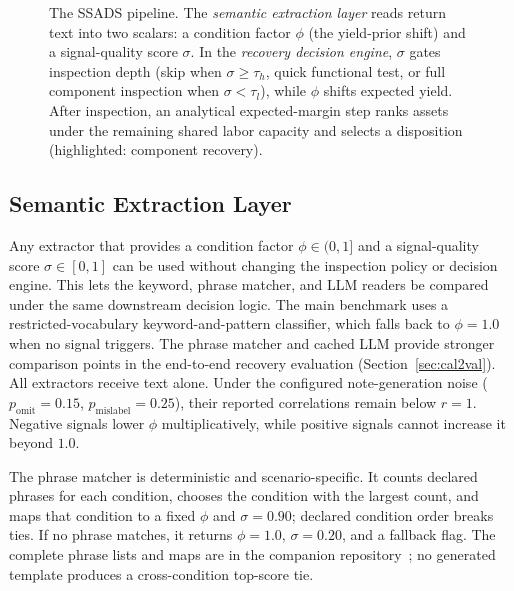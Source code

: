 \documentclass[a4paper,conference]{IEEEtran}
\begin{document}
\begin{figure}[t]
  \caption{The SSADS pipeline. The \emph{semantic extraction layer} reads return
    text into two scalars: a condition factor $\phi$ (the yield-prior shift) and a
    signal-quality score $\sigma$. In the \emph{recovery decision engine}, $\sigma$ gates
    inspection depth (skip when $\sigma{\ge}\tau_h$, quick functional test, or full
    component inspection when $\sigma{<}\tau_l$), while $\phi$ shifts expected yield.
    After inspection, an analytical expected-margin step ranks assets under the
    remaining shared labor capacity and selects a disposition (highlighted:
    component recovery).}
  \label{fig:pipeline}
\end{figure}

\subsection{Semantic Extraction Layer}
Any extractor that provides a condition factor $\phi\in(0,1]$ and a signal-quality score
$\sigma\in[0,1]$ can be used without changing the inspection policy or decision
engine. This lets the keyword, phrase matcher, and LLM readers be compared under
the same downstream decision logic. The main benchmark uses a restricted-vocabulary
keyword-and-pattern classifier, which falls back to $\phi{=}1.0$ when no signal
triggers. The phrase matcher and cached LLM provide stronger comparison points in
the end-to-end recovery evaluation (Section~\ref{sec:cal2val}). All extractors
receive text alone. Under the configured note-generation noise
($p_\text{omit}{=}0.15$, $p_\text{mislabel}{=}0.25$), their reported correlations
remain below $r{=}1$. Negative signals lower $\phi$ multiplicatively, while positive
signals cannot increase it beyond $1.0$.

The phrase matcher is deterministic and scenario-specific. It counts declared
phrases for each condition, chooses the condition with the largest count, and maps
that condition to a fixed $\phi$ and $\sigma{=}0.90$; declared condition order breaks
ties. If no phrase matches, it returns $\phi{=}1.0$, $\sigma{=}0.20$, and a fallback
flag. The complete phrase lists and maps are in the companion
repository~\cite{RLDBRepo}; no generated template produces a cross-condition top-score tie.
\end{document}
